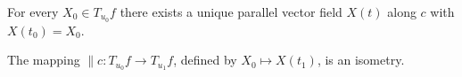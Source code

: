 For every $X_0 \in T_{u_0}f$ there exists a unique parallel vector field $X(t)$ along $c$ with $X(t_0) = X_0$.

The mapping $\|c\colon T_{u_0}f \rightarrow T_{u_1}f$, defined by $X_0 \mapsto X(t_1)$, is an isometry.
